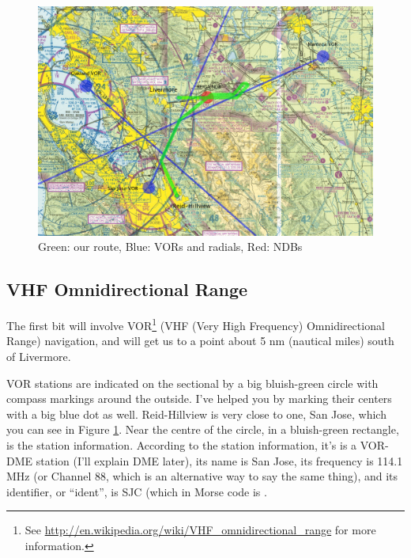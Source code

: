 \begin{figure}
  \begin{center}
    \includegraphics[width=20cm, angle=-90]{img/sectional_labelled.png}
    \caption{Green: our route, Blue: VORs and radials, Red: NDBs}
    \label{fig:sectional_labelled}
  \end{center}
\end{figure}


\subsection{VHF Omnidirectional Range}

The first bit will involve
VOR\footnote{See \url{http://en.wikipedia.org/wiki/VHF_omnidirectional_range}
for more information.} (VHF (Very High Frequency) Omnidirectional
Range) navigation, and will get us to a point about 5 nm (nautical
miles) south of Livermore.

VOR stations are indicated on the sectional by a big bluish-green
circle with compass markings around the outside.  I've helped you by
marking their centers with a big blue dot as well.  Reid-Hillview is
very close to one, San Jose, which you can see in Figure
\ref{fig:sectional_labelled}.  Near the centre of the circle, in a
bluish-green rectangle, is the station information.  According to the
station information, it's is a VOR-DME station (I'll explain DME
later), its name is San Jose, its frequency is 114.1 MHz (or Channel
88, which is an alternative way to say the same thing), and its
identifier, or ``ident'', is SJC (which in Morse code is
\mdot\mdot\mdot\mspace \mdot\mdash\mdash\mdash\mspace
\mdash\mdot\mdash\mdot.

